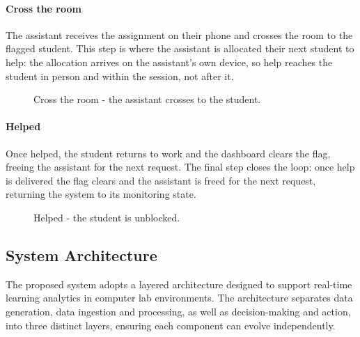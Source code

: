 \newpage
\paragraph{Cross the room} The assistant receives the assignment on their phone and crosses the room to the flagged student. 
This step is where the assistant is allocated their next student to help: the allocation arrives on the assistant's own device, so help reaches the student in person and within the session, not after it.

\begin{figure}[H]
    \centering
    \caption{Cross the room - the assistant crosses to the student.}
    \label{fig:sb-cross}
\end{figure}

\newpage
\paragraph{Helped} Once helped, the student returns to work and the dashboard clears the flag, freeing the assistant for the next request.
The final step closes the loop: once help is delivered the flag clears and the assistant is freed for the next request, returning the system to its monitoring state.
\begin{figure}[H]
    \centering
    \caption{Helped - the student is unblocked.}
    \label{fig:sb-helped}
\end{figure}

\subsection{System Architecture}

The proposed system adopts a layered architecture designed to support real-time learning analytics in computer lab environments. 
The architecture separates data generation, data ingestion and processing, as well as decision-making and action, into three distinct layers, ensuring each component can evolve independently.

